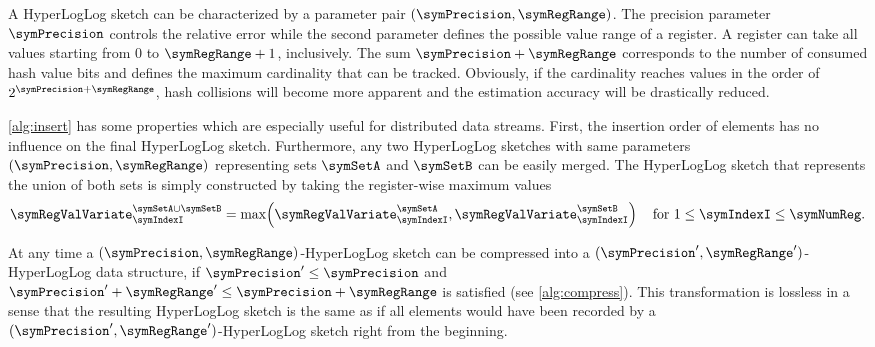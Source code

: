 \documentclass[a4paper]{scrartcl}
\begin{document}
A HyperLogLog sketch can be characterized by a parameter pair $(\symPrecision, \symRegRange)$. The precision parameter $\symPrecision$ controls the relative error while the second parameter defines the possible value range of a register. A register can take all values starting from 0 to $\symRegRange+1$, inclusively. The sum $\symPrecision+\symRegRange$ corresponds to the number of consumed hash value bits and defines the maximum cardinality that can be tracked. Obviously, if the cardinality reaches values in the order of $2^{\symPrecision+\symRegRange}$, hash collisions will become more apparent and the estimation accuracy will be drastically reduced.

\cref{alg:insert} has some properties which are especially useful for distributed data streams. First, the insertion order of elements has no influence on the final HyperLogLog sketch. Furthermore, any two HyperLogLog sketches with same parameters $(\symPrecision, \symRegRange)$ representing sets $\symSetA$ and $\symSetB$ can be easily merged. The HyperLogLog sketch that represents the union of both sets is simply constructed by taking the register-wise maximum values
\begin{equation}
\label{equ:hll_union}
\symRegValVariate^{\symSetA\cup\symSetB}_{\symIndexI} = 
\max
\!
\left(
\symRegValVariate^{\symSetA}_{\symIndexI},
\symRegValVariate^{\symSetB}_{\symIndexI}
\right)
\quad
\text{for $1\leq\symIndexI\leq\symNumReg$}.
\end{equation}

At any time a $(\symPrecision, \symRegRange)$-HyperLogLog sketch can be compressed into a $(\symPrecision', \symRegRange')$-HyperLogLog data structure, if $\symPrecision'\leq\symPrecision$ and $\symPrecision'+\symRegRange' \leq\symPrecision + \symRegRange$ is satisfied (see \cref{alg:compress}). This transformation is lossless in a sense that the resulting HyperLogLog sketch is the same as if all elements would have been recorded by a $(\symPrecision', \symRegRange')$-HyperLogLog sketch right from the beginning.
\end{document}
